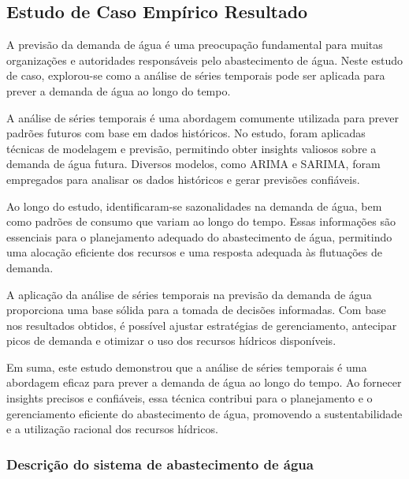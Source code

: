\subsection{Estudo de Caso Emp\'irico Resultado}\label{subsec:estudo-reslt}


A previsão da demanda de água é uma preocupação fundamental para muitas organizações e autoridades responsáveis pelo abastecimento de água. Neste estudo de caso, explorou-se como a análise de séries temporais pode ser aplicada para prever a demanda de água ao longo do tempo.

A análise de séries temporais é uma abordagem comumente utilizada para prever padrões futuros com base em dados históricos. No estudo, foram aplicadas técnicas de modelagem e previsão, permitindo obter insights valiosos sobre a demanda de água futura. Diversos modelos, como ARIMA e SARIMA, foram empregados para analisar os dados históricos e gerar previsões confiáveis.

Ao longo do estudo, identificaram-se sazonalidades na demanda de água, bem como padrões de consumo que variam ao longo do tempo. Essas informações são essenciais para o planejamento adequado do abastecimento de água, permitindo uma alocação eficiente dos recursos e uma resposta adequada às flutuações de demanda.

A aplicação da análise de séries temporais na previsão da demanda de água proporciona uma base sólida para a tomada de decisões informadas. Com base nos resultados obtidos, é possível ajustar estratégias de gerenciamento, antecipar picos de demanda e otimizar o uso dos recursos hídricos disponíveis.

Em suma, este estudo demonstrou que a análise de séries temporais é uma abordagem eficaz para prever a demanda de água ao longo do tempo. Ao fornecer insights precisos e confiáveis, essa técnica contribui para o planejamento e o gerenciamento eficiente do abastecimento de água, promovendo a sustentabilidade e a utilização racional dos recursos hídricos.



\subsubsection{Descri\c c\~ao do sistema de abastecimento de \'agua}


